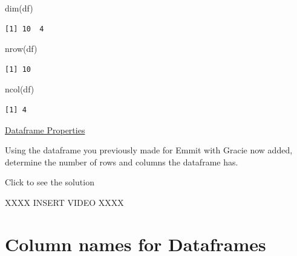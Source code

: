 \documentclass[
  letterpaper,
  DIV=11,
  numbers=noendperiod]{scrreprt}
\newenvironment{Shaded}{\begin{snugshade}}{\end{snugshade}}
\newcommand{\FunctionTok}[1]{\textcolor[rgb]{0.28,0.35,0.67}{#1}}
\newcommand{\NormalTok}[1]{\textcolor[rgb]{0.00,0.23,0.31}{#1}}
\begin{document}
\begin{Shaded}
\begin{Highlighting}[]
\FunctionTok{dim}\NormalTok{(df)}
\end{Highlighting}
\end{Shaded}

\begin{verbatim}
[1] 10  4
\end{verbatim}

\begin{Shaded}
\begin{Highlighting}[]
\FunctionTok{nrow}\NormalTok{(df)}
\end{Highlighting}
\end{Shaded}

\begin{verbatim}
[1] 10
\end{verbatim}

\begin{Shaded}
\begin{Highlighting}[]
\FunctionTok{ncol}\NormalTok{(df)}
\end{Highlighting}
\end{Shaded}

\begin{verbatim}
[1] 4
\end{verbatim}

\begin{watch}{}{}
    \href{https://youtu.be/fYxmRUeK4qw}{Dataframe Properties}
\end{watch}

\begin{tcolorbox}[enhanced jigsaw, colbacktitle=quarto-callout-tip-color!10!white, breakable, bottomrule=.15mm, colframe=quarto-callout-tip-color-frame, left=2mm, opacitybacktitle=0.6, title=\textcolor{quarto-callout-tip-color}{\faLightbulb}\hspace{0.5em}{Try it Out}, leftrule=.75mm, opacityback=0, rightrule=.15mm, titlerule=0mm, bottomtitle=1mm, colback=white, toprule=.15mm, arc=.35mm, toptitle=1mm, coltitle=black]

Using the dataframe you previously made for Emmit with Gracie now added,
determine the number of rows and columns the dataframe has.

Click to see the solution

XXXX INSERT VIDEO XXXX

\end{tcolorbox}

\section{Column names for Dataframes}\label{column-names-for-dataframes}
\end{document}
